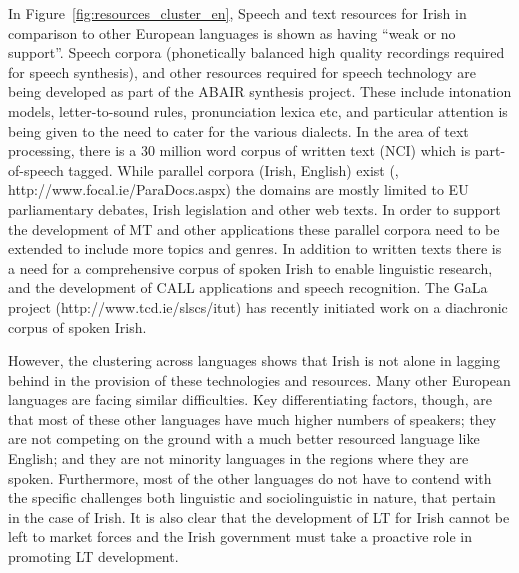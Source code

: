 \begin{multicols}{2}
In Figure~\ref{fig:resources_cluster_en}, Speech and text resources for Irish in comparison to other European languages is shown as having ``weak or no support''. Speech corpora (phonetically balanced high quality recordings required for speech synthesis), and other resources required for speech technology are being developed as part of the ABAIR synthesis  project. These include intonation models, letter-to-sound rules, pronunciation lexica etc, and particular attention is being given to the need to cater for the various dialects.  In the area of text processing, there is a 30 million word corpus of written text (NCI) which is part-of-speech tagged. While  parallel corpora (Irish, English) exist (\cite{scannell}, http://www.focal.ie/ParaDocs.aspx) the domains are mostly limited to EU parliamentary debates, Irish legislation and other web texts. In order to support the development of MT and other applications these parallel corpora need to be extended to include more topics and genres. In addition to written texts there is a need for a comprehensive corpus of spoken Irish to enable linguistic research, and the development of CALL applications and speech recognition. The GaLa project (http://www.tcd.ie/slscs/itut) has recently initiated work on a diachronic corpus of spoken Irish.

However, the clustering across languages shows that Irish is not alone in lagging behind in the provision of these technologies and resources. Many other European languages are facing similar difficulties.  Key differentiating factors, though, are that most of these other languages have much higher numbers of speakers; they are not competing on the ground with a much better resourced language like English; and they are not minority languages in the regions where they are spoken. Furthermore, most of the other languages do not have to contend with the specific challenges both linguistic and sociolinguistic in nature, that pertain in the case of Irish. It is also clear that the development of LT for Irish cannot be left to market forces and the Irish government must take a proactive role in promoting LT development.


\end{multicols}
